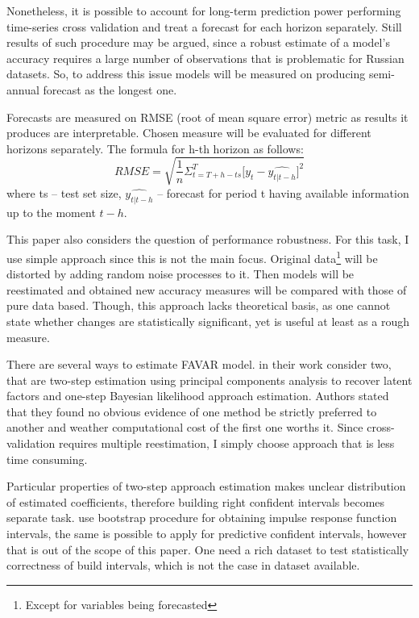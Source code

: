 \documentclass[a4paper, 14pt]{article}
\begin{document}
Nonetheless, it is possible to account for long-term prediction power performing time-series cross validation and treat a forecast for each horizon separately. Still results of such procedure may be argued, since a robust estimate of a model's accuracy requires a large number of observations that is problematic for Russian datasets. So, to address this issue models will be measured on producing semi-annual forecast as the longest one. 

Forecasts are measured on RMSE (root of mean square error) metric
as results it produces are interpretable. Chosen measure will be evaluated for different horizons separately. The formula for h-th horizon as follows:
\[
	RMSE = 
	\sqrt{
		\frac{1}{n}
		\Sigma_{t= T + h - ts}^{T}
			\Big[
			y_t - \widehat{y_{t|t-h}}
			\Big]^2}
\] where ts -- test set size, $\widehat{y_{t|t-h}}$ -- forecast for period t having available information up to the moment $t-h$.

This paper also considers the question of performance robustness. For this task, I use simple approach since this is not the main focus. Original data\footnote{Except for variables being forecasted} will be distorted by adding random noise processes to it. Then models will be reestimated and obtained new accuracy measures will be compared with those of pure data based. Though, this approach lacks theoretical basis, as one cannot state whether changes are statistically significant, yet is useful at least as a rough measure.

There are several ways to estimate FAVAR model. \cite{bernanke2005measuring} in their work consider two, that are two-step estimation using principal components analysis to recover latent factors and one-step Bayesian likelihood approach estimation. Authors stated that they found no obvious evidence of one method be strictly preferred to another and weather computational cost of the first one worths it. Since cross-validation requires multiple reestimation, I simply choose approach that is less time consuming. 

Particular properties of two-step approach estimation makes unclear distribution of estimated coefficients, therefore building right confident intervals becomes separate task. \cite{bernanke2005measuring} use bootstrap procedure for obtaining impulse response function intervals, the same is possible to apply for predictive confident intervals, however that is out of the scope of this paper. One need a rich dataset to test statistically correctness of build intervals, which is not the case in dataset available.
\end{document}
